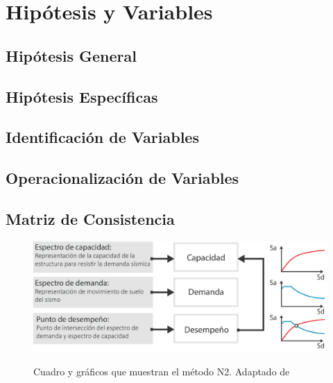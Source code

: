 \section{Hipótesis y Variables}

\subsection{Hipótesis General}

\subsection{Hipótesis Específicas}

\subsection{Identificación de Variables}

\subsection{Operacionalización de Variables}

\subsection{Matriz de Consistencia}

\lipsum[17]

\lipsum[18]

\begin{figure}[!ht]
  \caption{Cuadro y gráficos que muestran el método N2. Adaptado de \cite{deWaal2009}}
  \includegraphics[scale=0.36]{E_IMAGENES/3_Capitulo3/Cap3_Imagen70.png}
	\label{Cap3_Figura3}
\end{figure}

\lipsum[19]